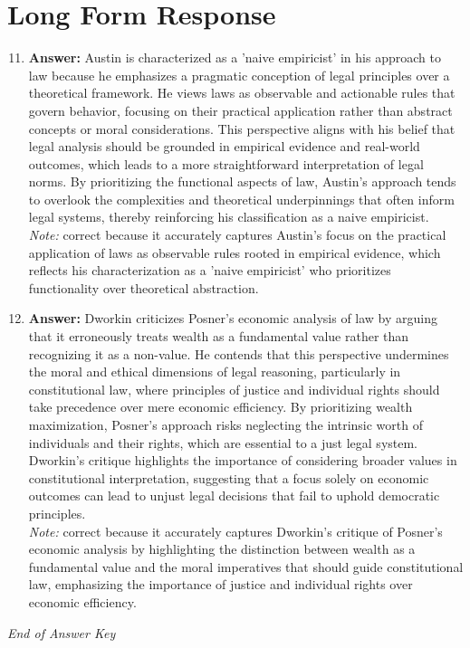 \documentclass[12pt]{article}
\begin{document}
\section*{Long Form Response}
\begin{enumerate}[label=\arabic*.]
\setcounter{enumi}{10}
\item \textbf{Answer:} Austin is characterized as a 'naive empiricist' in his approach to law because he emphasizes a pragmatic conception of legal principles over a theoretical framework. He views laws as observable and actionable rules that govern behavior, focusing on their practical application rather than abstract concepts or moral considerations. This perspective aligns with his belief that legal analysis should be grounded in empirical evidence and real-world outcomes, which leads to a more straightforward interpretation of legal norms. By prioritizing the functional aspects of law, Austin's approach tends to overlook the complexities and theoretical underpinnings that often inform legal systems, thereby reinforcing his classification as a naive empiricist.
\\ \textit{Note:} correct because it accurately captures Austin's focus on the practical application of laws as observable rules rooted in empirical evidence, which reflects his characterization as a 'naive empiricist' who prioritizes functionality over theoretical abstraction.
\item \textbf{Answer:} Dworkin criticizes Posner's economic analysis of law by arguing that it erroneously treats wealth as a fundamental value rather than recognizing it as a non-value. He contends that this perspective undermines the moral and ethical dimensions of legal reasoning, particularly in constitutional law, where principles of justice and individual rights should take precedence over mere economic efficiency. By prioritizing wealth maximization, Posner's approach risks neglecting the intrinsic worth of individuals and their rights, which are essential to a just legal system. Dworkin's critique highlights the importance of considering broader values in constitutional interpretation, suggesting that a focus solely on economic outcomes can lead to unjust legal decisions that fail to uphold democratic principles.
\\ \textit{Note:} correct because it accurately captures Dworkin's critique of Posner's economic analysis by highlighting the distinction between wealth as a fundamental value and the moral imperatives that should guide constitutional law, emphasizing the importance of justice and individual rights over economic efficiency.
\end{enumerate}

\vfill
\noindent\textit{End of Answer Key}
\end{document}
